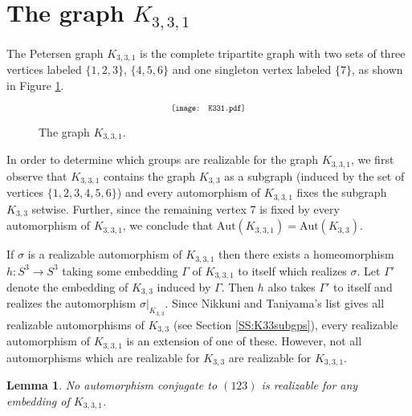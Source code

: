 \documentclass[11]{amsart}
\def\Aut{{\mathrm{Aut}}}
\newtheorem{lemma}[theorem]{Lemma}
\theoremstyle{definition}
\theoremstyle{remark}
\begin{document}
\section{The graph $K_{3,3,1}$} 
\label{S:K331}


 The Petersen graph $K_{3,3,1}$ is the complete tripartite graph with two sets of three vertices labeled $\{1,2,3\}$, $\{4,5,6\}$ and one singleton vertex labeled $\{7\}$, as shown in Figure \ref{F:K331}.    
 
 \begin{figure} [h]
$$\scalebox{.7}{\texttt{[image: K331.pdf]}}$$
\caption{The graph $K_{3,3,1}$.}
\label{F:K331}
\end{figure}
 

In order to determine which groups are realizable for the graph $K_{3,3,1}$, we first observe that $K_{3,3,1}$ contains the graph $K_{3,3}$ as a subgraph (induced by the set of vertices $\{1,2,3,4,5,6\}$) and every automorphism of $K_{3,3,1}$ fixes the subgraph $K_{3,3}$ setwise.  Further, since the remaining vertex 7 is fixed by every automorphism of $K_{3,3,1}$, we conclude that $\Aut(K_{3,3,1}) = \Aut(K_{3,3})$. 
 
If $\sigma$ is a realizable automorphism of $K_{3,3,1}$ then there exists a homeomorphism $h: S^3\to S^3$ taking some embedding $\Gamma$ of $K_{3,3,1}$ to itself which realizes $\sigma$.  Let $\Gamma'$ denote the embedding of $K_{3,3}$ induced by $\Gamma$.  Then $h$ also takes $\Gamma'$ to itself and realizes the automorphism $\sigma \vert_{K_{3,3}}$.  Since Nikkuni and Taniyama's list \cite{nt} gives all realizable automorphisms of $K_{3,3}$ (see Section \ref{SS:K33subgps}), every realizable automorphism of $K_{3,3,1}$ is an extension of one of these.  However, not all automorphisms which are realizable for $K_{3,3}$ are realizable for $K_{3,3,1}$.



\begin{lemma}
\label{no3cycle}
No automorphism conjugate to $(123)$ is realizable for any embedding of $K_{3,3,1}$. 
\end{lemma}
\end{document}

